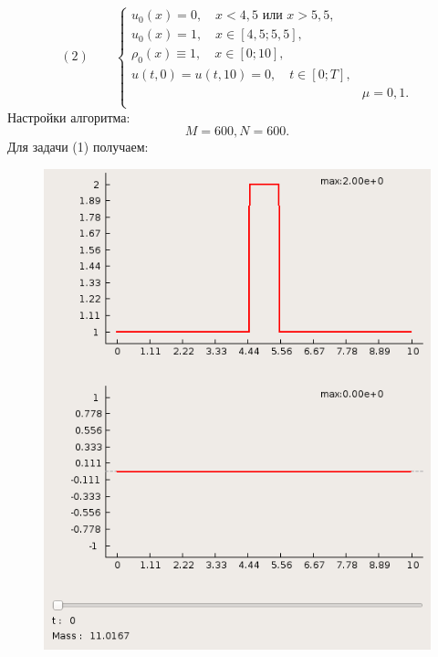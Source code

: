 \documentclass[a4paper, 11pt]{article}
\begin{document}
$$
(2)\quad \quad
\begin{cases}
u_0(x) = 0, \quad x < 4,5 \text{ или } x > 5,5,\\
u_0(x) = 1, \quad x \in [4,5; 5,5],\\
\rho_0(x) \equiv 1, \quad x \in [0; 10],\\
u(t, 0) = u(t, 10) = 0, \quad t \in [0; T],\\
& \mu =  0,1. \\
\end{cases}
$$
Настройки алгоритма:
$$
M = 600,
N = 600.
$$
Для задачи (1) получаем:
\newpage
\begin{figure}[h]
	\begin{minipage}[h] {0.49\linewidth}
		\includegraphics[width=1\linewidth]{p1/p1_t=0.png}
	\end{minipage}
	\begin{minipage}[h] {0.49\linewidth}

\end{minipage}
\end{figure}
\end{document}

